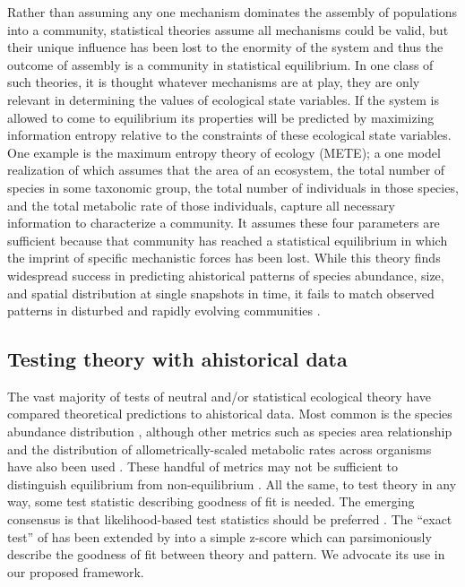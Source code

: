 \documentclass[12pt]{article}
\begin{document}
Rather than assuming any one mechanism dominates the assembly of
populations into a community,  statistical  theories
assume all mechanisms could be valid, but their unique influence
has been lost to the enormity of the system and thus the outcome of
assembly is a community in statistical equilibrium. In one class of
such theories, it is thought whatever mechanisms are at play,
they are only relevant in determining the values of ecological state
variables.  If the system is allowed to come to equilibrium
its properties will be predicted by maximizing information entropy
relative to the constraints of these ecological state variables.  One example is
the maximum entropy theory of ecology (METE); a one model realization of
which assumes that the area of an ecosystem, the total number of
species in some taxonomic group, the total number of individuals in
those species, and the total metabolic rate of those individuals,
capture all necessary information to characterize a community.  It assumes these four parameters are sufficient because
% 
% 
that community has reached a statistical equilibrium in which the
imprint of specific mechanistic forces has been lost. While this
theory finds widespread success in predicting ahistorical patterns of
species abundance, size, and spatial distribution \citep{Harte2011-um,
  White2012-yw, Xiao2015-jv} at single snapshots in
time, it fails to match observed patterns in disturbed and rapidly
evolving communities \citep{Rominger2015-kb, Harte2011-um}.
% 
% 
% 

\subsection{Testing theory with ahistorical data}

The vast majority of tests of neutral and/or statistical ecological
theory have compared theoretical predictions to ahistorical data. Most
common is the species abundance distribution \citep{Hubbell2001-dx,
  Harte2011-um, White2012-yw}, although other metrics such as species
area relationship and the distribution of allometrically-scaled
metabolic rates across organisms have also been used
\citep{Harte2011-um, Xiao2015-jv}. These handful of metrics may not
% 
% 
be sufficient to distinguish equilibrium from non-equilibrium
\citep[as discussed here and in][]{McGill2003-jy, McGill2007-zd}. All
the same, to test theory in any way, some test statistic describing
goodness of fit is needed. The emerging consensus is that
likelihood-based test statistics should be preferred
\citep{baldridge2016}. The ``exact test'' of \citep{etienne2007} has
been extended by \citep{meteR} into a simple z-score which can
parsimoniously describe the goodness of fit between theory and
pattern.  We advocate its use in our proposed framework.
% 
% 
\end{document}
